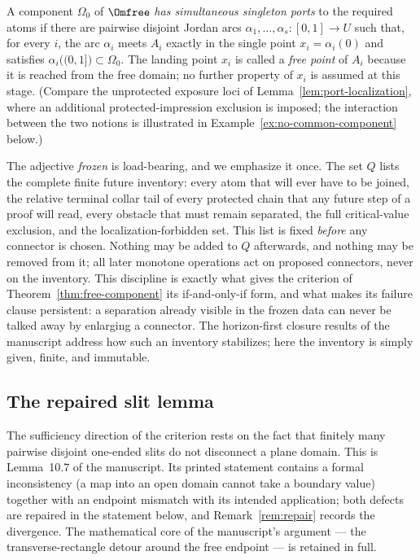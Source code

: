 A component $\Omega_0$ of $\Omfree$ \emph{has simultaneous singleton ports} to the
required atoms if there are pairwise disjoint Jordan arcs
$\alpha_1,\dots,\alpha_s\colon[0,1]\to U$ such that, for every $i$, the arc $\alpha_i$
meets $A_i$ exactly in the single point $x_i=\alpha_i(0)$ and satisfies
$\alpha_i\bigl((0,1]\bigr)\subset\Omega_0$. The landing point $x_i$ is called a
\emph{free point} of $A_i$ because it is reached from the free domain; no further
property of $x_i$ is assumed at this stage. (Compare the unprotected exposure loci of
Lemma~\ref{lem:port-localization}, where an additional protected-impression exclusion is
imposed; the interaction between the two notions is illustrated in
Example~\ref{ex:no-common-component} below.)

The adjective \emph{frozen} is load-bearing, and we emphasize it once. The set $Q$ lists
the complete finite future inventory: every atom that will ever have to be joined, the
relative terminal collar tail of every protected chain that any future step of a proof will
read, every obstacle that must remain separated, the full critical-value exclusion, and
the localization-forbidden set. This list is fixed \emph{before} any connector is chosen.
Nothing may be added to $Q$ afterwards, and nothing may be removed from it; all later
monotone operations act on proposed connectors, never on the inventory. This discipline
is exactly what gives the criterion of Theorem~\ref{thm:free-component} its
if-and-only-if form, and what makes its failure clause persistent: a separation already
visible in the frozen data can never be talked away by enlarging a connector. The
horizon-first closure results of the manuscript \cite{MWman} address how such an
inventory stabilizes; here the inventory is simply given, finite, and immutable.

\subsection{The repaired slit lemma}\label{subsec:D-slits}

The sufficiency direction of the criterion rests on the fact that finitely many pairwise
disjoint one-ended slits do not disconnect a plane domain. This is Lemma~10.7 of the
manuscript. Its printed statement contains a formal inconsistency (a map into an open
domain cannot take a boundary value) together with an endpoint mismatch with its
intended application; both defects are repaired in the statement below, and
Remark~\ref{rem:repair} records the divergence. The mathematical core of the
manuscript's argument --- the transverse-rectangle detour around the free endpoint ---
is retained in full.

